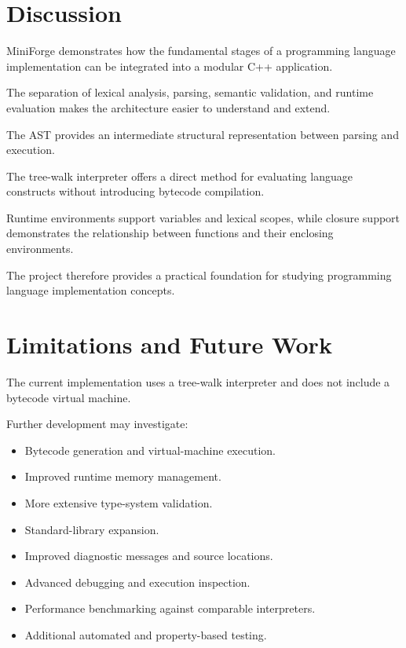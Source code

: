 \documentclass[conference]{IEEEtran}
\begin{document}
\section{Discussion}

MiniForge demonstrates how the fundamental stages
of a programming language implementation can be
integrated into a modular C++ application.

The separation of lexical analysis, parsing,
semantic validation, and runtime evaluation makes
the architecture easier to understand and extend.

The AST provides an intermediate structural
representation between parsing and execution.

The tree-walk interpreter offers a direct method
for evaluating language constructs without
introducing bytecode compilation.

Runtime environments support variables and
lexical scopes, while closure support demonstrates
the relationship between functions and their
enclosing environments.

The project therefore provides a practical
foundation for studying programming language
implementation concepts.

\section{Limitations and Future Work}

The current implementation uses a tree-walk
interpreter and does not include a bytecode
virtual machine.

Further development may investigate:

\begin{itemize}
    \item Bytecode generation and virtual-machine execution.
    \item Improved runtime memory management.
    \item More extensive type-system validation.
    \item Standard-library expansion.
    \item Improved diagnostic messages and source locations.
    \item Advanced debugging and execution inspection.
    \item Performance benchmarking against comparable interpreters.
    \item Additional automated and property-based testing.
\end{itemize}
\end{document}
